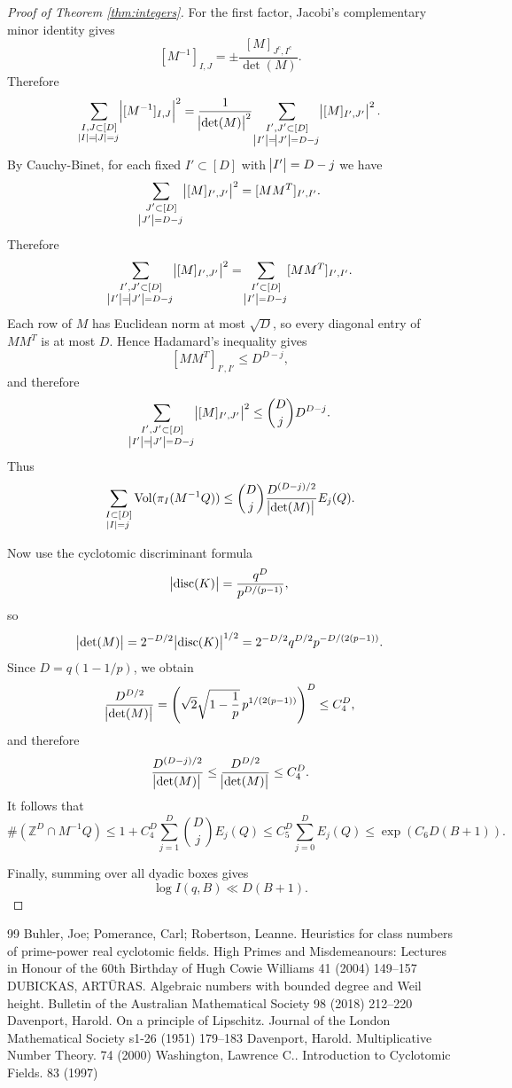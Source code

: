 \documentclass[10pt,a4paper]{amsart}
\newcommand{\bZ}{\mathbb{Z}}
\DeclareMathOperator{\Vol}{Vol}
\DeclareMathOperator{\disc}{disc}
\begin{document}
\begin{proof}[Proof of Theorem \ref{thm:integers}]
For the first factor, Jacobi's complementary minor identity gives
\[
[M^{-1}]_{I,J}
=
\pm \frac{[M]_{J^c,I^c}}{\det(M)}.
\]
Therefore
\[
\sum_{\substack{I,J \subset [D] \\ \abs{I}=\abs{J}=j}}
\abs{[M^{-1}]_{I,J}}^2
=
\frac{1}{\abs{\det(M)}^2}
\sum_{\substack{I',J' \subset [D] \\ \abs{I'}=\abs{J'}=D-j}}
\abs{[M]_{I',J'}}^2.
\]
By Cauchy-Binet, for each fixed $I' \subset [D]$ with $\abs{I'}=D-j$ we have
\[
\sum_{\substack{J' \subset [D] \\ \abs{J'}=D-j}}
\abs{[M]_{I',J'}}^2
=
[MM^T]_{I',I'}.
\]
Therefore
\[
\sum_{\substack{I',J' \subset [D] \\ \abs{I'}=\abs{J'}=D-j}}
\abs{[M]_{I',J'}}^2
=
\sum_{\substack{I' \subset [D] \\ \abs{I'}=D-j}}
[MM^T]_{I',I'}.
\]
Each row of $M$ has Euclidean norm at most $\sqrt{D}$, so every diagonal entry of $MM^T$ is at most $D$. Hence Hadamard's inequality gives
\[
[MM^T]_{I',I'} \leq D^{D-j},
\]
and therefore
\[
\sum_{\substack{I',J' \subset [D] \\ \abs{I'}=\abs{J'}=D-j}}
\abs{[M]_{I',J'}}^2
\leq
\binom{D}{j} D^{D-j}.
\]
Thus
\[
\sum_{\substack{I \subset [D] \\ \abs{I}=j}} \Vol(\pi_I(M^{-1}Q))
\leq
\binom{D}{j}\frac{D^{(D-j)/2}}{\abs{\det(M)}} E_j(Q).
\]

Now use the cyclotomic discriminant formula
\[
\abs{\disc(K)}=\frac{q^D}{p^{D/(p-1)}},
\]
so
\[
\abs{\det(M)}=2^{-D/2}\abs{\disc(K)}^{1/2}
=
2^{-D/2} q^{D/2} p^{-D/(2(p-1))}.
\]
Since $D=q(1-1/p)$, we obtain
\[
\frac{D^{D/2}}{\abs{\det(M)}}
=
\left( \sqrt{2}\sqrt{1-\frac{1}{p}}\, p^{1/(2(p-1))} \right)^D
\leq
C_4^D,
\]
and therefore
\[
\frac{D^{(D-j)/2}}{\abs{\det(M)}}
\leq
\frac{D^{D/2}}{\abs{\det(M)}}
\leq
C_4^D.
\]
It follows that
\[
\#(\bZ^D \cap M^{-1}Q)
\leq
1+C_4^D\sum_{j=1}^D \binom{D}{j} E_j(Q)
\leq
C_5^D \sum_{j=0}^D E_j(Q)
\leq
\exp\left(C_6 D(B+1)\right).
\]

Finally, summing over all dyadic boxes gives
\[
\log I(q,B) \ll D(B+1).
\]
\end{proof}


\begin{thebibliography}{99}
 Buhler, Joe; Pomerance, Carl; Robertson, Leanne. Heuristics for class numbers of prime-power real cyclotomic fields. High Primes and Misdemeanours: Lectures in Honour of the 60th Birthday of Hugh Cowie Williams 41 (2004) 149--157
 DUBICKAS, ARTŪRAS. Algebraic numbers with bounded degree and Weil height. Bulletin of the Australian Mathematical Society 98 (2018) 212–220
 Davenport, Harold. On a principle of Lipschitz. Journal of the London Mathematical Society s1-26 (1951) 179--183
 Davenport, Harold. Multiplicative Number Theory. 74 (2000)
 Washington, Lawrence C.. Introduction to Cyclotomic Fields. 83 (1997)
\end{thebibliography}
\end{document}

